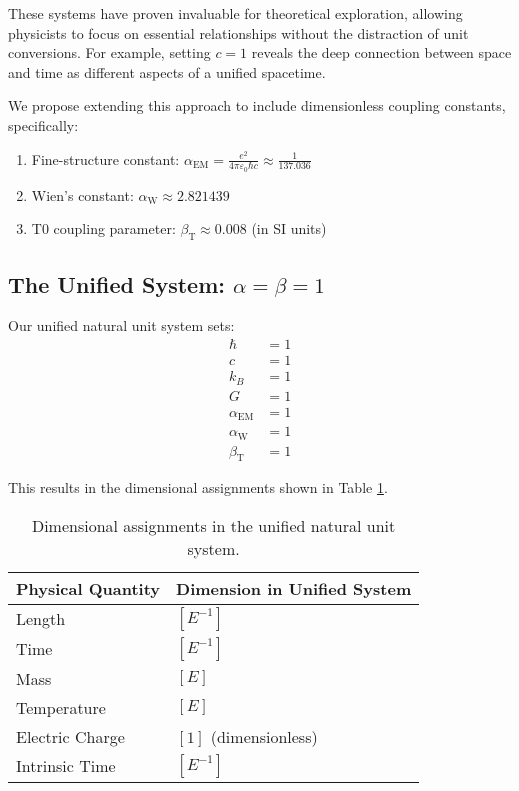 \documentclass[12pt,a4paper]{article} %
\newcommand{\alphaEM}{\alpha_{\text{EM}}}
\newcommand{\alphaW}{\alpha_{\text{W}}}
\newcommand{\betaT}{\beta_{\text{T}}}
\begin{document}
	These systems have proven invaluable for theoretical exploration,
	allowing physicists to focus on essential relationships
	without the distraction of unit conversions. 
	For example, setting $c = 1$ reveals the deep connection between space and time
	as different aspects of a unified spacetime.
	
	We propose extending this approach to include dimensionless coupling constants,
	specifically:
	\begin{enumerate}
		\item Fine-structure constant: 
		$\alphaEM = \frac{e^2}{4\pi\varepsilon_0\hbar c} \approx \frac{1}{137.036}$
		\item Wien's constant: $\alphaW \approx 2.821439$
		\item T0 coupling parameter: $\betaT \approx 0.008$ (in SI units)
	\end{enumerate}
	
	\subsection{The Unified System: $\alpha = \beta = 1$}
	\label{subsec:unified_system}
	
	Our unified natural unit system sets:
	\begin{align}
		\hbar &= 1 \\
		c &= 1 \\
		k_B &= 1 \\
		G &= 1 \\
		\alphaEM &= 1 \\
		\alphaW &= 1 \\
		\betaT &= 1
	\end{align}
	
	This results in the dimensional assignments shown in Table \ref{tab:dimensions}.
	
	\begin{table}[ht]
		\centering
		\caption{Dimensional assignments in the unified natural unit system.}
		\label{tab:dimensions}
		\begin{tabular}{ll} %
			\hline
			\textbf{Physical Quantity} & \textbf{Dimension in Unified System} \\
			\hline
			Length & $[E^{-1}]$ \\
			Time & $[E^{-1}]$ \\
			Mass & $[E]$ \\
			Temperature & $[E]$ \\
			Electric Charge & $[1]$ (dimensionless) \\
			Intrinsic Time & $[E^{-1}]$ \\
			\hline
		\end{tabular}
	\end{table}
	
\end{document}
